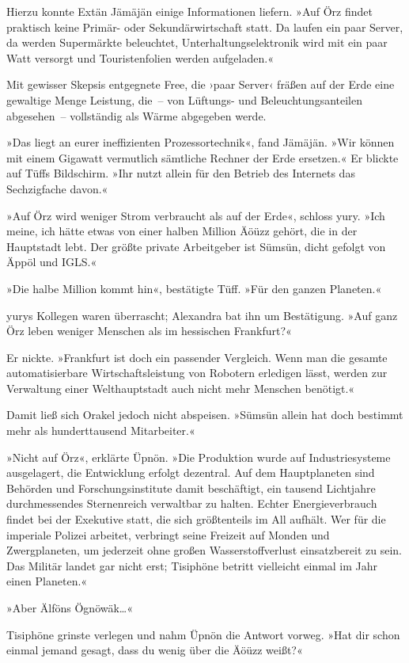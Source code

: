 Hierzu konnte Extän Jämäjän einige Informationen liefern. »Auf Örz findet praktisch keine Primär- oder Sekundärwirtschaft statt. Da laufen ein paar Server, da werden Supermärkte beleuchtet, Unterhaltungselektronik wird mit ein paar Watt versorgt und Touristenfolien werden aufgeladen.«

Mit gewisser Skepsis entgegnete Free, die ›paar Server‹ fräßen auf der Erde eine gewaltige Menge Leistung, die~– von Lüftungs- und Beleuchtungsanteilen abgesehen~– vollständig als Wärme abgegeben werde.

»Das liegt an eurer ineffizienten Prozessortechnik«, fand Jämäjän. »Wir können mit einem Gigawatt vermutlich sämtliche Rechner der Erde ersetzen.« Er blickte auf Tüffs Bildschirm. »Ihr nutzt allein für den Betrieb des Internets das Sechzigfache davon.«

»Auf Örz wird weniger Strom verbraucht als auf der Erde«, schloss yury. »Ich meine, ich hätte etwas von einer halben Million Äöüzz gehört, die in der Hauptstadt lebt. Der größte private Arbeitgeber ist Sümsün, dicht gefolgt von Äppöl und IGLS.«

»Die halbe Million kommt hin«, bestätigte Tüff. »Für den ganzen Planeten.«

yurys Kollegen waren überrascht; Alexandra bat ihn um Bestätigung. »Auf ganz Örz leben weniger Menschen als im hessischen Frankfurt?«

Er nickte. »Frankfurt ist doch ein passender Vergleich. Wenn man die gesamte automatisierbare Wirtschaftsleistung von Robotern erledigen lässt, werden zur Verwaltung einer Welthauptstadt auch nicht mehr Menschen benötigt.«

Damit ließ sich Orakel jedoch nicht abspeisen. »Sümsün allein hat doch bestimmt mehr als hunderttausend Mitarbeiter.«

»Nicht auf Örz«, erklärte Üpnön. »Die Produktion wurde auf Industriesysteme ausgelagert, die Entwicklung erfolgt dezentral. Auf dem Hauptplaneten sind Behörden und Forschungsinstitute damit beschäftigt, ein tausend Lichtjahre durchmessendes Sternenreich verwaltbar zu halten. Echter Energieverbrauch findet bei der Exekutive statt, die sich größtenteils im All aufhält. Wer für die imperiale Polizei arbeitet, verbringt seine Freizeit auf Monden und Zwergplaneten, um jederzeit ohne großen Wasserstoffverlust einsatzbereit zu sein. Das Militär landet gar nicht erst; Tisiphöne betritt vielleicht einmal im Jahr einen Planeten.«

»Aber Älföns Ögnöwäk…«

Tisiphöne grinste verlegen und nahm Üpnön die Antwort vorweg. »Hat dir schon einmal jemand gesagt, dass du wenig über die Äöüzz weißt?«

